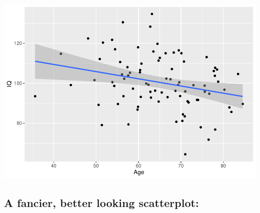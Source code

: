 \documentclass[
]{book}
\begin{document}
\includegraphics{_main_files/figure-latex/unnamed-chunk-15-1.pdf}

\subsection*{A fancier, better looking scatterplot:}\label{a-fancier-better-looking-scatterplot}
\end{document}
